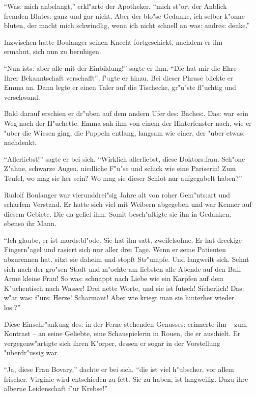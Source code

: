 \documentclass[oneside,12pt]{book}
\newcommand{\s}{s:}%
\begin{document}
"`Wa{\s} mich anbelangt,"' erkl"arte der Apotheker, "`mich st"ort
der Anblick fremden Blute{\s} ganz und gar nicht. Aber der blo"se
Gedanke, ich selber k"onne bluten, der macht mich schwindlig, wenn
ich nicht schnell an wa{\s} andre{\s} denke."'

Inzwischen hatte Boulanger seinen Knecht fortgeschickt, nachdem er
ihn ermahnt, sich nun zu beruhigen.

"`Nun ist{\s} aber alle mit der Einbildung!"' sagte er ihm. "`Die
hat mir die Ehre Ihrer Bekanntschaft verschafft"', f"ugte er
hinzu. Bei dieser Phrase blickte er Emma an. Dann legte er einen
Taler auf die Tischecke, gr"u"ste fl"uchtig und verschwand.

Bald darauf erschien er dr"uben auf dem andern Ufer de{\s}
Bache{\s}. Da{\s} war sein Weg nach der H"uchette. Emma sah ihm
von einem der Hinterfenster nach, wie er "uber die Wiesen ging,
die Pappeln entlang, langsam wie einer, der "uber etwa{\s}
nachdenkt.

"`Allerliebst!"' sagte er bei sich. "`Wirklich allerliebst, diese
Doktor{\s}frau. Sch"one Z"ahne, schwarze Augen, niedliche F"u"se
und schick wie eine Pariserin! Zum Teufel, wo mag sie her sein? Wo
mag sie dieser Schlot nur aufgegabelt haben?"'

Rudolf Boulanger war vierunddrei"sig Jahre alt von roher
Gem"ut{\s}art und scharfem Verstand. Er hatte sich viel mit
Weibern abgegeben und war Kenner auf diesem Gebiete. Die da gefiel
ihm. Somit besch"aftigte sie ihn in Gedanken, ebenso ihr Mann.

"`Ich glaube, er ist mord{\s}bl"ode. Sie hat ihn satt,
zweifelsohne. Er hat dreckige Fingern"agel und rasiert sich nur
aller drei Tage. Wenn er seine Patienten abzurennen hat, sitzt sie
daheim und stopft Str"umpfe. Und langweilt sich. Sehnt sich nach
der gro"sen Stadt und m"ochte am liebsten alle Abende auf den
Ball. Arme kleine Frau! So wa{\s} schnappt nach Liebe wie ein
Karpfen auf dem K"uchentisch nach Wasser! Drei nette Worte, und
sie ist futsch! Sicherlich! Da{\s} w"ar wa{\s} f"ur{\s} Herze!
Scharmant! Aber wie kriegt man sie hinterher wieder lo{\s}?"'

Diese Einschr"ankung de{\s} in der Ferne stehenden Genusse{\s}
erinnerte ihn -- zum Kontrast -- an seine Geliebte, eine
Schauspielerin in Rouen, die er au{\s}hielt. Er vergegenw"artigte
sich ihren K"orper, dessen er sogar in der Vorstellung
"uberdr"ussig war.

"`Ja, diese Frau Bovary,"' dachte er bei sich, "`die ist viel
h"ubscher, vor allem frischer. Virginie wird entschieden zu fett.
Sie zu haben, ist langweilig. Dazu ihre alberne Leidenschaft f"ur
Krebse!"'
\end{document}
